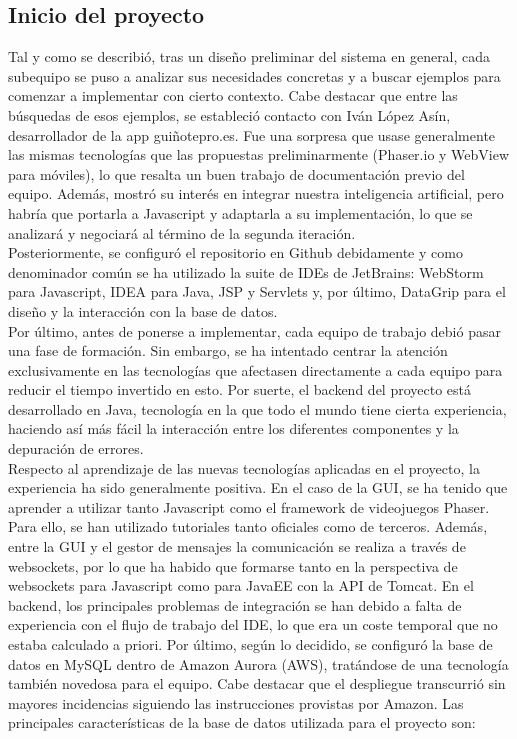 \subsection{Inicio del proyecto}
\label{Inicio del proyecto}
Tal y como se describió, tras un diseño preliminar del sistema en general, cada subequipo se puso a analizar sus necesidades concretas y a buscar ejemplos para comenzar a implementar con cierto contexto. Cabe destacar que entre las búsquedas de esos ejemplos, se estableció contacto con Iván López Asín, desarrollador de la app guiñotepro.es. Fue una sorpresa que usase generalmente las mismas tecnologías que las propuestas preliminarmente (Phaser.io y WebView para móviles), lo que resalta un buen trabajo de documentación previo del equipo. Además, mostró su interés en integrar nuestra  inteligencia artificial, pero habría que portarla a Javascript y adaptarla a su implementación, lo que se analizará y negociará al término de la segunda iteración.\\

Posteriormente, se configuró el repositorio en Github debidamente y como denominador común se ha utilizado la suite de IDEs de JetBrains: WebStorm para Javascript, IDEA para Java, JSP y Servlets y, por último, DataGrip para el diseño y la interacción con la base de datos.\\

Por último, antes de ponerse a implementar, cada equipo de trabajo debió pasar una fase de formación. Sin embargo, se ha intentado centrar la atención exclusivamente en las tecnologías que afectasen directamente a cada equipo para reducir el tiempo invertido en esto. Por suerte, el backend del proyecto está desarrollado en Java, tecnología en la que todo el mundo tiene cierta experiencia, haciendo así más fácil la interacción entre los diferentes componentes y la depuración de errores.\\

Respecto al aprendizaje de las nuevas tecnologías aplicadas en el proyecto, la experiencia ha sido generalmente positiva. En el caso de la GUI, se ha tenido que aprender a utilizar tanto Javascript como el framework de videojuegos Phaser. Para ello, se han utilizado tutoriales tanto oficiales como de terceros. Además, entre la GUI y el gestor de mensajes la comunicación se realiza a través de websockets, por lo que ha habido que formarse tanto en la perspectiva de websockets para Javascript como para JavaEE con la API de Tomcat. En el backend, los principales problemas de integración se han debido a falta de experiencia con el flujo de trabajo del IDE, lo que era un coste temporal que no estaba calculado a priori. Por último, según lo decidido, se configuró la base de datos en MySQL dentro de Amazon Aurora (AWS), tratándose de una tecnología también novedosa para el equipo. Cabe destacar que el despliegue transcurrió sin mayores incidencias siguiendo las instrucciones provistas por Amazon. Las principales características de la base de datos utilizada para el proyecto son:

